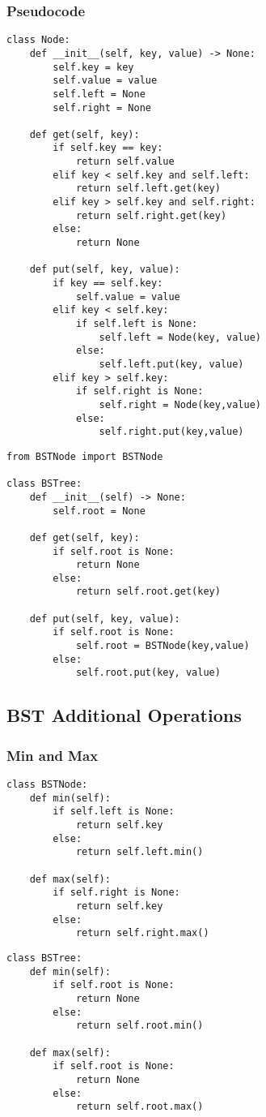 \documentclass[a4paper]{article}
\begin{document}
\subsubsection*{Pseudocode}
\begin{lstlisting}
class Node:
    def __init__(self, key, value) -> None:
        self.key = key
        self.value = value
        self.left = None
        self.right = None

    def get(self, key):
        if self.key == key:
            return self.value
        elif key < self.key and self.left:
            return self.left.get(key)
        elif key > self.key and self.right:
            return self.right.get(key)
        else:
            return None
        
    def put(self, key, value):
        if key == self.key:
            self.value = value
        elif key < self.key:
            if self.left is None:
                self.left = Node(key, value)
            else:
                self.left.put(key, value)
        elif key > self.key:
            if self.right is None:
                self.right = Node(key,value)
            else:
                self.right.put(key,value)
\end{lstlisting}
\begin{lstlisting}
from BSTNode import BSTNode

class BSTree:
    def __init__(self) -> None:
        self.root = None
    
    def get(self, key):
        if self.root is None:
            return None
        else:
            return self.root.get(key)
        
    def put(self, key, value):
        if self.root is None:
            self.root = BSTNode(key,value)
        else:
            self.root.put(key, value)
\end{lstlisting}

\subsection{BST Additional Operations}
\subsubsection*{Min and Max}
\begin{lstlisting}
class BSTNode:
    def min(self):
        if self.left is None:
            return self.key
        else:
            return self.left.min()
        
    def max(self):
        if self.right is None:
            return self.key
        else:
            return self.right.max()
\end{lstlisting}
\begin{lstlisting}
class BSTree:
    def min(self):
        if self.root is None:
            return None
        else:
            return self.root.min()

    def max(self):
        if self.root is None:
            return None
        else:
            return self.root.max()
\end{lstlisting}
\end{document}
